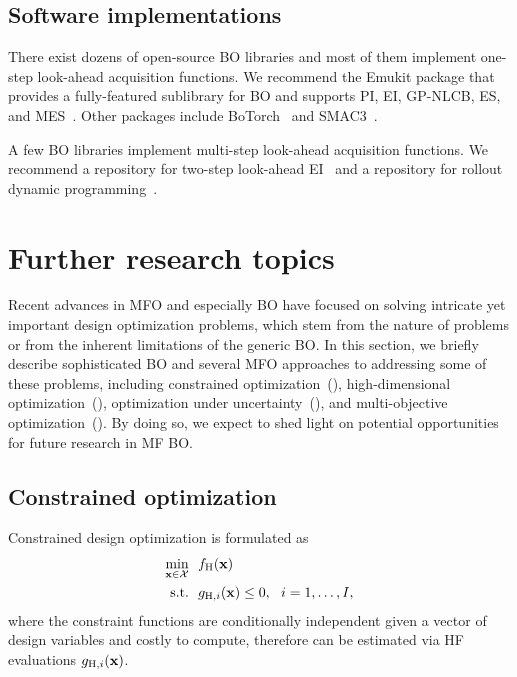 \documentclass[journal ]{new-aiaa}
\begin{document}
\subsection{Software implementations}\label{Sec55}

There exist dozens of open-source BO libraries and most of them implement one-step look-ahead acquisition functions.
We recommend the Emukit package that provides a fully-featured sublibrary for BO and supports PI, EI, GP-NLCB, ES, and MES~\citep{Paleyes2019}.
Other packages include BoTorch~\citep{Balandat2020} and SMAC3~\citep{Lindauer2022}.

A few BO libraries implement multi-step look-ahead acquisition functions. 
We recommend a repository for two-step look-ahead EI~\citep{WuJ2019} and a repository for rollout dynamic programming~\citep{Lee2020}.

\section{Further research topics}\label{Sec6}

Recent advances in MFO and especially BO have focused on solving intricate yet important design optimization problems, which stem from the nature of problems or from the inherent limitations of the generic BO.  
In this section, we briefly describe sophisticated BO and several MFO approaches to addressing some of these problems, including constrained optimization~(), high-dimensional optimization~(), optimization under uncertainty~(), and multi-objective optimization~().
By doing so, we expect to shed light on potential opportunities for future research in MF BO.

\subsection{Constrained optimization}\label{Sec61}

Constrained design optimization is formulated as
\begin{equation}\label{eqn58}
	\begin{aligned}
		\underset{{\bf x} \in \mathcal{X}}{\min} \ \ & f_\text{H}(\bf x)\\
		\textrm{s.t.} \ \ 
		& g_{\text{H},i}({\bf x}) \leq 0,\ \ i=1,\dots,I, 
	\end{aligned}
\end{equation}
where the constraint functions are conditionally independent given a vector of design variables and costly to compute, therefore can be estimated via HF evaluations $g_{\text{H},i}({\bf x})$.
\end{document}

